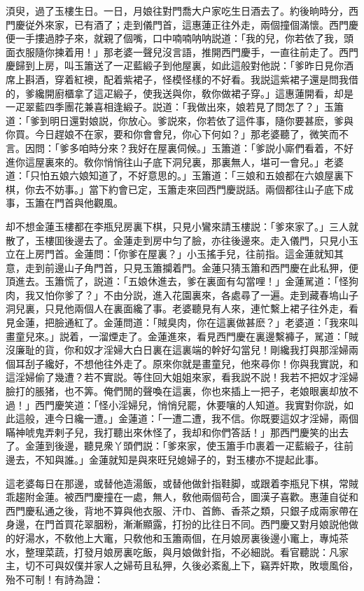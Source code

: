 湏臾，過了玉樓生日。一日，月娘往對門喬大户家吃生日酒去了。約後晌時分，西門慶従外來家，已有酒了；走到儀門首，這惠蓮正往外走，兩個撞個滿懷。西門慶便一手摟過脖子來，就親了個嘴，口中喃喃呐呐説道：「我的兒，你若依了我，頭面衣服隨你揀着用！」那老婆一聲兒沒言語，推開西門慶手，一直往前走了。西門慶歸到上房，叫玉簫送了一疋藍緞子到他屋裏，如此這般對他説：「爹昨日見你酒席上斟酒，穿着紅襖，配着紫裙子，怪模怪樣的不好看。我説這紫裙子還是問我借的，爹纔開廚櫃拿了這疋緞子，使我送與你，敎你做裙子穿。」這惠蓮開看，却是一疋翠藍四季團花兼喜相逢緞子。説道：「我做出來，娘若見了問怎了？」玉簫道：「爹到明日還對娘説，你放心。爹説來，你若依了這件事，隨你要甚麽，爹與你買。今日趕娘不在家，要和你會會兒，你心下何如？」那老婆聽了，微笑而不言。因問：「爹多咱時分來？我好在屋裏伺候。」玉簫道：「爹説小廝們看着，不好進你這屋裏來的。敎你悄悄往山子底下洞兒裏，那裏無人，堪可一會兒。」老婆道：「只怕五娘六娘知道了，不好意思的。」玉簫道：「三娘和五娘都在六娘屋裏下棋，你去不妨事。」當下約會已定，玉簫走來回西門慶説話。兩個都往山子底下成事，玉簫在門首與他觀風。

却不想金蓮玉樓都在李瓶兒房裏下棋，只見小鸞來請玉樓説：「爹來家了。」三人就散了，玉樓囬後邊去了。金蓮走到房中匀了臉，亦往後邊來。走入儀門，只見小玉立在上房門首。金蓮問：「你爹在屋裏？」小玉搖手兒，往前指。這金蓮就知其意，走到前邊山子角門首，只見玉簫攔着門。金蓮只猜玉簫和西門慶在此私狎，便頂進去。玉簫慌了，説道：「五娘休進去，爹在裏面有勾當哩！」金蓮駡道：「怪狗肉，我又怕你爹了？」不由分説，進入花園裏來，各處尋了一遍。走到藏春塢山子洞兒裏，只見他兩個人在裏面纔了事。老婆聽見有人來，連忙繫上裙子往外走，看見金蓮，把臉通紅了。金蓮問道：「賊臭肉，你在這裏做甚麽？」老婆道：「我來叫畫童兒來。」説着，一溜煙走了。金蓮進來，看見西門慶在裏邊繫褲子，駡道：「賊沒廉耻的貨，你和奴才淫婦大白日裏在這裏端的幹好勾當兒！剛纔我打與那淫婦兩個耳刮子纔好，不想他往外走了。原來你就是畫童兒，他來尋你！你與我實説，和這淫婦偷了幾遭？若不實説。等住回大姐姐來家，看我説不説！我若不把奴才淫婦臉打的脹猪，也不筭。俺們閒的聲喚在這裏，你也來插上一把子，老娘眼裏却放不過！」西門慶笑道：「怪小淫婦兒，悄悄兒罷，休要嚷的人知道。我實對你説，如此這般，連今日纔一遭。」金蓮道：「一遭二遭，我不信。你既要這奴才淫婦，兩個瞞神唬鬼弄剌子兒，我打聽出來休怪了，我却和你們答話！」那西門慶笑的出去了。金蓮到後邊，聽見衆丫頭們説：「爹來家，使玉簫手巾裹着一疋藍緞子，往前邊去，不知與誰。」金蓮就知是與來旺兒媳婦子的，對玉樓亦不提起此事。

這老婆每日在那邊，或替他造湯飯，或替他做針指鞋脚，或跟着李瓶兒下棋，常賊乖趨附金蓮。被西門慶撞在一處，無人，敎他兩個苟合，圖漢子喜歡。惠蓮自従和西門慶私通之後，背地不算與他衣服、汗巾、首飾、香茶之類，只銀子成兩家帶在身邊，在門首買花翠胭粉，漸漸顯露，打扮的比往日不同。西門慶又對月娘説他做的好湯水，不敎他上大竃，只敎他和玉簫兩個，在月娘房裏後邊小竃上，專炖茶水，整理菜蔬，打發月娘房裏吃飯，與月娘做針指，不必細説。看官聽説：凡家主，切不可與奴僕并家人之婦苟且私狎，久後必紊亂上下，竊弄奸欺，敗壞風俗，殆不可制！有詩為證：

